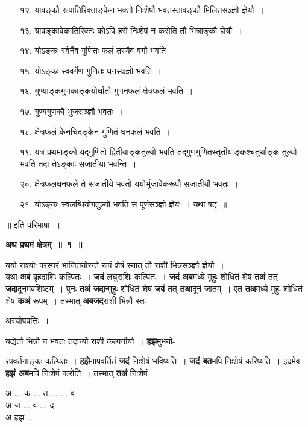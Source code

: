\documentclass[11pt, openany]{book}
\begin{document}
\newpage
 \begin{enumerate}
\item[१२.] यावङ्कौ रूपातिरिक्ताङ्केन भक्तौ निःशेषौ भवतस्तावङ्कौ मिलितसञ्ज्ञौ ज्ञेयौ~। 
\item[१३.] यावङ्कावेकातिरिक्तः कोऽपि हरो निःशेषं न करोति तौ भिन्नाङ्कौ ज्ञेयौ~। 
\item[१४.] योऽङ्कः स्वेनैव गुणितः फलं तस्यैव वर्गो भवति~। 
\item[१५.] योऽङ्कः स्ववर्गेण गुणितः घनसञ्ज्ञो भवति~। 
\item[१६.] गुण्याङ्कगुणकाङ्कयोर्घातो गुणनफलं क्षेत्रफलं भवति~। 
\item[१७.] गुण्यगुणकौ भुजसञ्ज्ञौ भवतः~। 
\item[१८.] क्षेत्रफलं केनचिदङ्केन गुणितं घनफलं भवति~। 
\item[१९.] यत्र प्रथमाङ्को यद्गुणितो द्वितीयाङ्कतुल्यो भवति तद्गुणगुणितस्तृतीयाङ्कश्चतुर्थाङ्क-तुल्यो भवति तदा तेऽङ्काः सजातीया भवन्ति~। 
\item[२०.] क्षेत्रफलघनफले ते सजातीये भवतो ययोर्भुजावेकरूपौ सजातीयौ भवतः~। 
\item[२१.] योऽङ्कः स्वलब्धियोगतुल्यो भवति स पूर्णसञ्ज्ञो ज्ञेयः~। यथा षट्~॥ 
\end{enumerate}
\begin{center}
॥ इति परिभाषा~॥ 
\vspace{6mm}

 \textbf{\large अथ प्रथमं क्षेत्रम्~॥~१~॥}
 \end{center}
 \vspace{2mm}
 
 {\ab ययो राश्योः परस्परं भाजितयोरन्ते रूपं शेषं स्यात् तौ राशी भिन्नसञ्ज्ञौ ज्ञेयौ~। }\\

 यथा \textbf{अबं} बृहद्राशिः कल्पितः~। \textbf{जदं} लघुराशिः कल्पितः~। \textbf{जदं अब}मध्ये मुहुः शोधितं शेषं \textbf{तअं} तत् \textbf{जदा}दूनमवशिष्टम्~। पुनः \textbf{तअं} \textbf{जदा}न्मुहुः शोधितं शेषं \textbf{जवं} तत् \textbf{तआ}दूनं जातम्~। एत \textbf{तअ}मध्ये मुहुः शोधितं शेषं \textbf{कअं} रूपम्~। तस्मात् \textbf{अबजद}राशी भिन्नौ स्तः~। 

\begin{center}
अस्योपपत्तिः~। 
\end{center}

यद्येतौ भिन्नौ न भवतः तदान्यौ राशी कल्पनीयौ~। \textbf{हझ}मुभयो- 


\newpage
\begin{flushleft}
\begin{minipage}[t]{0.6\textwidth}
\noindent रपवर्तनाङ्कः कल्पितः~। \textbf{हझे}नापवर्तितं
\textbf{जदं} निःशेषं भविष्यति~। \textbf{जदं बत}मपि निःशेषं
करिष्यति~। इदमेव \textbf{हझं अब}मपि निःशेषं करोति~। तस्मात् \textbf{तअं} निःशेषं
\end{minipage} 
\hfill
\begin{minipage}[t]{0.3\textwidth}
अ ... क ... त ... ... ब\\
{\color{white}अ} ज ... व ... द\\
{\color{white}अ} हझ ...
\end{minipage}
\end{flushleft}
\vspace{-3mm}
\end{document}
